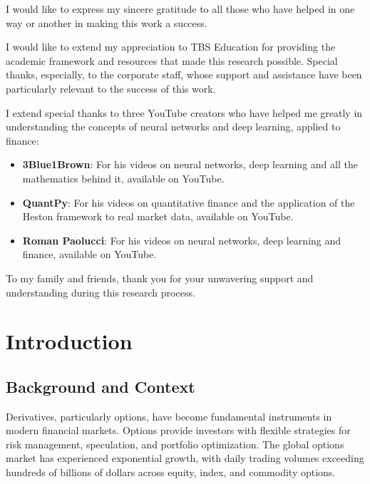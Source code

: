 \documentclass[12pt,a4paper]{article}
\begin{document}
I would like to express my sincere gratitude to all those who have helped in one way or another in making this work a success.

I would like to extend my appreciation to TBS Education for providing the academic framework and resources that made this research possible. Special thanks, especially, to the corporate staff, whose support and assistance have been particularly relevant to the success of this work.

I extend special thanks to three YouTube creators who have helped me greatly in understanding the concepts of neural networks and deep learning, applied to finance:

\begin{itemize}[noitemsep]

\item \textbf{3Blue1Brown}: For his videos on neural networks, deep learning and all the mathematics behind it, available on YouTube.

\item \textbf{QuantPy}: For his videos on quantitative finance and the application of the Heston framework to real market data, available on YouTube.

\item \textbf{Roman Paolucci}: For his videos on neural networks, deep learning and finance, available on YouTube.

\end{itemize}

To my family and friends, thank you for your unwavering support and understanding during this research process.




\newpage

\section{Introduction}

\label{sec:introduction}

\subsection{Background and Context}

Derivatives, particularly options, have become fundamental instruments in modern financial markets. Options provide investors with flexible strategies for risk management, speculation, and portfolio optimization. The global options market has experienced exponential growth, with daily trading volumes exceeding hundreds of billions of dollars across equity, index, and commodity options.
\end{document}
